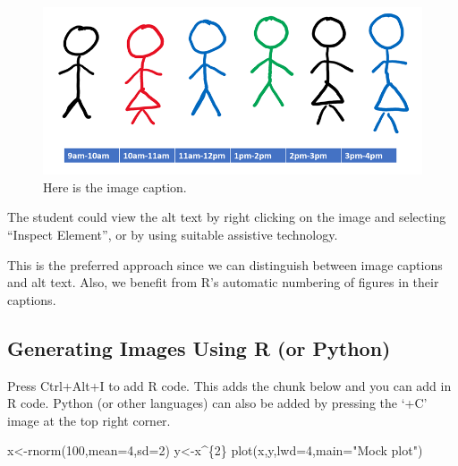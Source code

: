 \documentclass[
  letterpaper,
  oneside]{book}
\newenvironment{Shaded}{\begin{snugshade}}{\end{snugshade}}
\newcommand{\AttributeTok}[1]{\textcolor[rgb]{0.40,0.45,0.13}{#1}}
\newcommand{\DecValTok}[1]{\textcolor[rgb]{0.68,0.00,0.00}{#1}}
\newcommand{\FunctionTok}[1]{\textcolor[rgb]{0.28,0.35,0.67}{#1}}
\newcommand{\NormalTok}[1]{\textcolor[rgb]{0.00,0.23,0.31}{#1}}
\newcommand{\OtherTok}[1]{\textcolor[rgb]{0.00,0.23,0.31}{#1}}
\newcommand{\SpecialCharTok}[1]{\textcolor[rgb]{0.37,0.37,0.37}{#1}}
\newcommand{\StringTok}[1]{\textcolor[rgb]{0.13,0.47,0.30}{#1}}
\numberwithin{equation}{section}
\numberwithin{figure}{section}
\theoremstyle{break}
\theoremstyle{plain}
\theoremstyle{remark}
\begin{document}
\begin{figure}[H]

{\centering \includegraphics[width=6.25in,height=\textheight,keepaspectratio]{workers.png}

}

\caption{Here is the image caption.}

\end{figure}%

The student could view the alt text by right clicking on the image and
selecting ``Inspect Element'', or by using suitable assistive
technology.

This is the preferred approach since we can distinguish between image
captions and alt text. Also, we benefit from R's automatic numbering of
figures in their captions.

\subsection{Generating Images Using R (or
Python)}\label{generating-images-using-r-or-python}

Press Ctrl+Alt+I to add R code. This adds the chunk below and you can
add in R code. Python (or other languages) can also be added by pressing
the `+C' image at the top right corner.

\begin{Shaded}
\begin{Highlighting}[]
\NormalTok{x}\OtherTok{\textless{}{-}}\FunctionTok{rnorm}\NormalTok{(}\DecValTok{100}\NormalTok{,}\AttributeTok{mean=}\DecValTok{4}\NormalTok{,}\AttributeTok{sd=}\DecValTok{2}\NormalTok{)}
\NormalTok{y}\OtherTok{\textless{}{-}}\NormalTok{x}\SpecialCharTok{\^{}}\NormalTok{\{}\DecValTok{2}\NormalTok{\}}
\FunctionTok{plot}\NormalTok{(x,y,}\AttributeTok{lwd=}\DecValTok{4}\NormalTok{,}\AttributeTok{main=}\StringTok{"Mock plot"}\NormalTok{)}
\end{Highlighting}
\end{Shaded}
\end{document}
